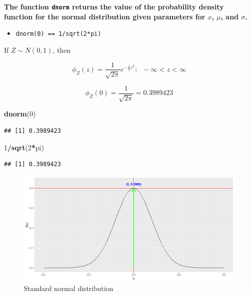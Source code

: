\documentclass[
]{book}
\newenvironment{Shaded}{\begin{snugshade}}{\end{snugshade}}
\newcommand{\DecValTok}[1]{\textcolor[rgb]{0.00,0.00,0.81}{#1}}
\newcommand{\FunctionTok}[1]{\textcolor[rgb]{0.13,0.29,0.53}{\textbf{#1}}}
\newcommand{\NormalTok}[1]{#1}
\newcommand{\SpecialCharTok}[1]{\textcolor[rgb]{0.81,0.36,0.00}{\textbf{#1}}}
\providecommand{\tightlist}{%
  \setlength{\itemsep}{0pt}\setlength{\parskip}{0pt}}
\begin{document}
\textbf{The function \texttt{dnorm} returns the value of the probability density function for the normal distribution given parameters for \(x\), \(\mu\), and \(\sigma\).}

\begin{itemize}
\tightlist
\item
  \texttt{dnorm(0)\ ==\ 1/sqrt(2*pi)}
\end{itemize}

If \(Z\sim N(0,1)\), then

\[\phi_Z(z) = \frac{1}{\sqrt{2 \pi}}e^{-\frac{1}{2}z^2};\;\; -\infty< z< \infty\]

\[\phi_Z(0) = \frac{1}{\sqrt{2 \pi}} =  0.3989423\]

\begin{Shaded}
\begin{Highlighting}[]
\FunctionTok{dnorm}\NormalTok{(}\DecValTok{0}\NormalTok{)}
\end{Highlighting}
\end{Shaded}

\begin{verbatim}
## [1] 0.3989423
\end{verbatim}

\begin{Shaded}
\begin{Highlighting}[]
\DecValTok{1}\SpecialCharTok{/}\FunctionTok{sqrt}\NormalTok{(}\DecValTok{2}\SpecialCharTok{*}\NormalTok{pi)}
\end{Highlighting}
\end{Shaded}

\begin{verbatim}
## [1] 0.3989423
\end{verbatim}

\begin{figure}

{\centering \includegraphics{figure/norm4-1} 

}

\caption{Standard normal distribution}\label{fig:norm4}
\end{figure}
\end{document}
